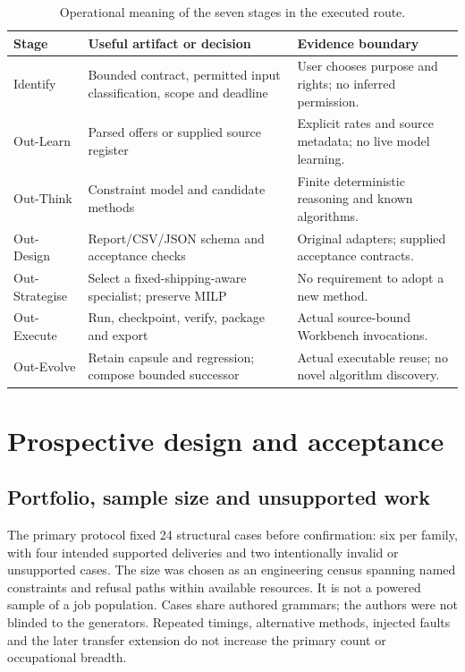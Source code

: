 \begin{table}[htbp]\centering\small
\caption{Operational meaning of the seven stages in the executed route.}\label{tab:stages}
\begin{tabularx}{\linewidth}{@{}lXX@{}}\toprule
Stage & Useful artifact or decision & Evidence boundary\\\midrule
Identify & Bounded contract, permitted input classification, scope and deadline & User chooses purpose and rights; no inferred permission.\\
Out-Learn & Parsed offers or supplied source register & Explicit rates and source metadata; no live model learning.\\
Out-Think & Constraint model and candidate methods & Finite deterministic reasoning and known algorithms.\\
Out-Design & Report/CSV/JSON schema and acceptance checks & Original adapters; supplied acceptance contracts.\\
Out-Strategise & Select a fixed-shipping-aware specialist; preserve MILP & No requirement to adopt a new method.\\
Out-Execute & Run, checkpoint, verify, package and export & Actual source-bound Workbench invocations.\\
Out-Evolve & Retain capsule and regression; compose bounded successor & Actual executable reuse; no novel algorithm discovery.\\\bottomrule
\end{tabularx}
\end{table}

\section{Prospective design and acceptance}

\subsection{Portfolio, sample size and unsupported work}

The primary protocol fixed 24 structural cases before confirmation: six per family, with four intended supported deliveries and two intentionally invalid or unsupported cases. The size was chosen as an engineering census spanning named constraints and refusal paths within available resources. It is not a powered sample of a job population. Cases share authored grammars; the authors were not blinded to the generators. Repeated timings, alternative methods, injected faults and the later transfer extension do not increase the primary count or occupational breadth.

